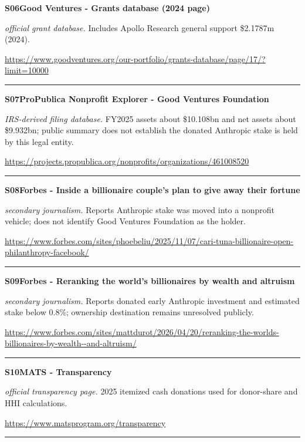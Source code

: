 \hypertarget{src:S06}{}\noindent\textbf{S06}\quad \textbf{Good Ventures - Grants database (2024 page)}\hfill{}\par
\smallskip
\noindent\textit{official grant database.} Includes Apollo Research general support \$2.1787m (2024).\par
\noindent\url{https://www.goodventures.org/our-portfolio/grants-database/page/17/?limit=10000}\par
\medskip\hrule\medskip

\hypertarget{src:S07}{}\noindent\textbf{S07}\quad \textbf{ProPublica Nonprofit Explorer - Good Ventures Foundation}\hfill{}\par
\smallskip
\noindent\textit{IRS-derived filing database.} FY2025 assets about \$10.108bn and net assets about \$9.932bn; public summary does not establish the donated Anthropic stake is held by this legal entity.\par
\noindent\url{https://projects.propublica.org/nonprofits/organizations/461008520}\par
\medskip\hrule\medskip

\hypertarget{src:S08}{}\noindent\textbf{S08}\quad \textbf{Forbes - Inside a billionaire couple's plan to give away their fortune}\hfill{}\par
\smallskip
\noindent\textit{secondary journalism.} Reports Anthropic stake was moved into a nonprofit vehicle; does not identify Good Ventures Foundation as the holder.\par
\noindent\url{https://www.forbes.com/sites/phoebeliu/2025/11/07/cari-tuna-billionaire-open-philanthropy-facebook/}\par
\medskip\hrule\medskip

\hypertarget{src:S09}{}\noindent\textbf{S09}\quad \textbf{Forbes - Reranking the world's billionaires by wealth and altruism}\hfill{}\par
\smallskip
\noindent\textit{secondary journalism.} Reports donated early Anthropic investment and estimated stake below 0.8\%; ownership destination remains unresolved publicly.\par
\noindent\url{https://www.forbes.com/sites/mattdurot/2026/04/20/reranking-the-worlds-billionaires-by-wealth--and-altruism/}\par
\medskip\hrule\medskip

\hypertarget{src:S10}{}\noindent\textbf{S10}\quad \textbf{MATS - Transparency}\hfill{}\par
\smallskip
\noindent\textit{official transparency page.} 2025 itemized cash donations used for donor-share and HHI calculations.\par
\noindent\url{https://www.matsprogram.org/transparency}\par
\medskip\hrule\medskip

